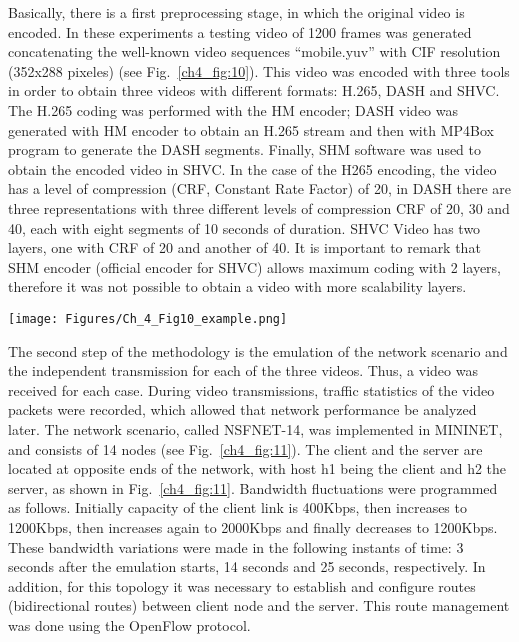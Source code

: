 Basically, there is a first preprocessing stage, in which the original video is encoded. In these experiments a testing video of 1200 frames was generated concatenating the well-known video sequences “mobile.yuv” with CIF resolution (352x288 pixeles) (see Fig.~\ref{ch4_fig:10}). This video was encoded with three tools in order to obtain three videos with different formats: H.265, DASH and SHVC. The H.265 coding was performed with the HM encoder; DASH video was generated with HM encoder to obtain an H.265 stream and then with MP4Box program to generate the DASH segments. Finally, SHM software was used to obtain the encoded video in SHVC. In the case of the H265 encoding, the video has a level of compression (CRF, Constant Rate Factor) of 20, in DASH there are three representations with three different levels of compression CRF of 20, 30 and 40, each with eight segments of 10 seconds of duration. SHVC Video has two layers, one with CRF of 20 and another of 40. It is important to remark that SHM encoder (official encoder for SHVC) allows maximum coding with 2 layers, therefore it was not possible to obtain a video with more scalability layers.

\begin{center}
\texttt{[image: Figures/Ch\_4\_Fig10\_example.png]}
\label{ch4_fig:10}       %
\end{center}


The second step of the methodology is the emulation of the network scenario and the independent transmission for each of the three videos. Thus, a video was received for each case. During video transmissions, traffic statistics of the video packets were recorded, which allowed that network performance be analyzed later. The network scenario, called NSFNET-14, was implemented in MININET, and consists of 14 nodes (see Fig.~\ref{ch4_fig:11}). The client and the server are located at opposite ends of the network, with host h1 being the client and h2 the server, as shown in Fig.~\ref{ch4_fig:11}. Bandwidth fluctuations were programmed as follows. Initially capacity of the client link is 400Kbps, then increases to 1200Kbps, then increases again to 2000Kbps and finally decreases to 1200Kbps. These bandwidth variations were made in the following instants of time: 3 seconds after the emulation starts, 14 seconds and 25 seconds, respectively. In addition, for this topology it was necessary to establish and configure routes (bidirectional routes) between client node and the server. This route management was done using the OpenFlow protocol.

